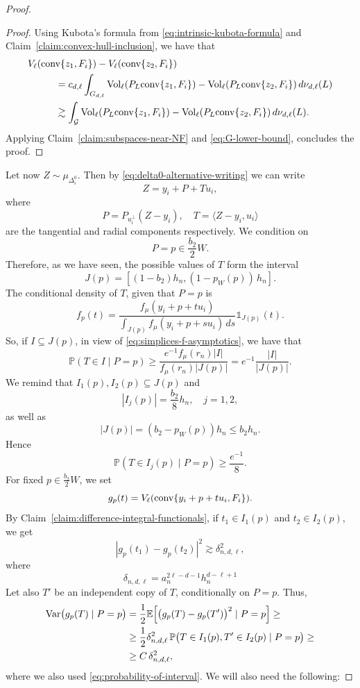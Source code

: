 \documentclass[10pt]{amsart}
\newcommand{\1}{\textbf{1}}
\newcommand{\conv}{{\rm conv}}
\newcommand{\vol}{{\rm Vol}}
\newcommand{\Var}{{\rm Var}}
\numberwithin{equation}{section} %
\theoremstyle{remark}
\theoremstyle{definition}
\begin{document}
\begin{proof}
\begin{proof}
Using Kubota's formula from \eqref{eq:intrinsic-kubota-formula} and Claim~\ref{claim:convex-hull-inclusion}, we have that 
\begin{align*}
&V_\ell(\conv\{z_1,F_i\})-V_\ell(\conv\{z_2,F_i\})\\
        &\hspace*{1cm}= c_{d,\ell}\int_{G_{d,\ell}} \vol_\ell(P_L\conv\{z_1,F_i\})-\vol_\ell(P_L\conv\{z_2,F_i\})\, d\nu_{d,\ell}(L)\\
        &\hspace*{1cm}\gtrsim \int_{\mathcal{G}} \vol_\ell(P_L\conv\{z_1,F_i\})-\vol_\ell(P_L\conv\{z_2,F_i\})\, d\nu_{d,\ell}(L).       
    \end{align*} 
Applying Claim~\ref{claim:subspaces-near-NF} and \eqref{eq:G-lower-bound}, concludes the proof.
\end{proof}

Let now $Z\sim \mu_{\Delta_i^0}$. Then by \eqref{eq:delta0-alternative-writing} we can write \[Z=y_i+P+Tu_i,\] where \[P=P_{u_i^\perp}(Z-y_i), \quad T=\langle Z-y_i,u_i\rangle\] are the tangential and radial components respectively. We condition on \[P=p \in \frac{b_2}{2}W.\]
Therefore, as we have seen, the possible values of $T$ form the interval \[J(p)=[(1-b_2)h_n,(1-p_W(p))\,h_n].\] The conditional density of $T$, given that $P=p$ is \[f_p(t)=\frac{f_\mu(y_i+p+tu_i)}{\int_{J(p)}f_\mu(y_i+p+su_i)\, ds} \mathds{1}_{J(p)}(t).\] So, if $I \subseteq J(p)$, in view of \eqref{eq:simplices-f-asymptotics}, we have that \[\mathbb{P}(T \in I\mid P=p) \geq \frac{e^{-1}f_\mu(r_n)|I|}{f_\mu(r_n)|J(p)|}=e^{-1}\frac{|I|}{|J(p)|}.\] We remind that $I_1(p),I_2(p) \subseteq J(p)$ and \[|I_j(p)|=\frac{b_2}{8}h_n, \quad j=1,2,\] as well as \[|J(p)|=(b_2-p_W(p))h_n \leq b_2h_n.\] Hence \begin{equation}\label{eq:probability-of-interval}
\mathbb{P}(T \in I_j(p)\mid P=p) \geq \frac{e^{-1}}{8}.
\end{equation}
For fixed $p \in \frac{b_2}{2}W$, we set \[g_p(t)=V_\ell(\conv\{y_i+p+tu_i,F_i\}).\] By Claim~\ref{claim:difference-integral-functionals}, if $t_1 \in I_1(p)$ and $t_2 \in I_2(p)$, we get \[|g_p(t_1)-g_p(t_2)|^2 \gtrsim \delta_{n,d,\ell}^2,\] where \[ \delta_{n,d,\ell}=a_n^{2\ell-d-1} h_n^{d-\ell+1}\] Let also $T'$ be an independent copy of $T$, conditionally on $P=p$. Thus,
\begin{equation}\label{eq:conditional-variance}
\begin{aligned}
        \Var\bigl(g_p(T)\mid P=p\bigr)&=\frac{1}{2} \mathbb{E}\!\left [\bigl(g_p(T)-g_p(T')\bigr)^2\mid P=p\right] \geq \\
    &\geq \frac{1}{2}\delta_{n,d,\ell}^2\, \mathbb{P}\bigl(T \in I_1(p), T' \in I_2(p)\mid P=p\bigr) \geq\\
    &\geq  C \,\delta_{n,d,\ell}^2,
\end{aligned}
\end{equation}
where we also used \eqref{eq:probability-of-interval}. We will also need the following:


\end{proof}
\end{document}
